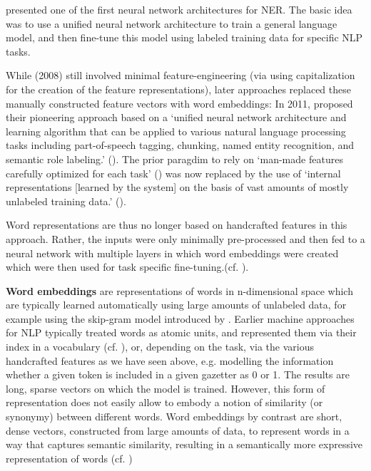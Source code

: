 \cite{collobert_2008} presented one of the first neural network architectures for NER. The basic idea was to use a unified neural network architecture to train a general language model, and then fine-tune this model using labeled training data for specific NLP tasks. 

While \citeauthor{collobert_2008} (2008) still involved minimal feature-engineering (via using capitalization for the creation of the feature representations), later approaches replaced these manually constructed feature vectors with word embeddings: In 2011, \citeauthor{collobert_natural_2011} proposed their pioneering approach based on a `unified neural network architecture and learning algorithm that can be applied to various natural language processing tasks including part-of-speech tagging, chunking, named entity recognition, and semantic role labeling.' (\cite{collobert_natural_2011}).  
The prior paragdim to rely on `man-made features carefully optimized for each task' (\cite{collobert_natural_2011}) was now replaced by the use of `internal representations [learned by the system] on the basis of vast amounts of mostly unlabeled training data.' (\cite{collobert_natural_2011}). 

Word representations are thus no longer based on handcrafted features in this approach. Rather, the inputs were only minimally pre-processed and then fed to a neural network with multiple layers in which word embeddings were created which were then used for task specific fine-tuning.(cf. \cite{collobert_natural_2011}). 

\textbf{Word embeddings} are representations of words in n-dimensional space which are typically learned automatically using large amounts of unlabeled data, for example using the skip-gram model introduced by \cite{mikolov_2013}. Earlier machine approaches for NLP typically treated words as atomic units, and represented them via their index in a vocabulary (cf. \cite{mikolov_2013}), or, depending on the task, via the various handcrafted features as we have seen above, e.g. modelling the information whether a given token is included in a given gazetter as 0 or 1. The results are long, sparse vectors on which the model is trained. 
However, this form of representation does not easily allow to embody a notion of similarity (or synonymy) between different words. Word embeddings by contrast are short, dense vectors, constructed from large amounts of data, to represent words in a way that captures semantic similarity, resulting in a semantically more expressive representation of words (cf. \cite[17]{jurafsky_2021_6})

